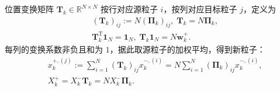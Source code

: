位置变换矩阵 $\bm T_k\in\mathbb R^{N\times N}$ 按行对应源粒子 $i$，按列对应目标粒子 $j$，定义为
\begin{equation}\label{cw:eq:particle-ot-conditional}
\begin{aligned}
&(\bm T_k)_{ij}:=N(\bm\Pi_k)_{ij},\;\bm T_k=N\bm\Pi_k,\\
&\bm T_k^{\mathrm T}\mathbf1_N=\mathbf1_N,\;\bm T_k\mathbf1_N=N\bm w_k^+.
\end{aligned}
\end{equation}
每列的变换系数非负且和为 $1$，据此取源粒子的加权平均，得到新粒子：
\begin{equation}\label{cw:eq:particle-ot-transform}
\begin{aligned}
&x_k^{+,(j)}:=\sum_{i=1}^N(\bm T_k)_{ij}x_k^{-,(i)}=N\sum_{i=1}^N(\bm\Pi_k)_{ij}x_k^{-,(i)},\\
&X_k^+=X_k^-\bm T_k=NX_k^-\bm\Pi_k.
\end{aligned}
\end{equation}
